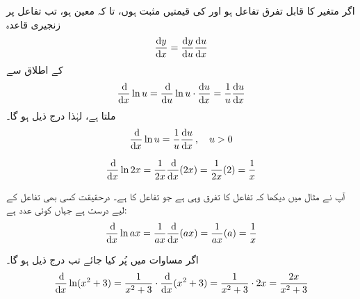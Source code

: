 اگر  متغیر  کا قابل تفرق تفاعل ہو اور  کی قیمتیں مثبت ہوں، تا کہ  معین  ہو، تب تفاعل  پر زنجیری قاعدہ
\begin{align*}
\frac{\dif y}{\dif x}=\frac{\dif y}{\dif u}\frac{\dif u}{\dif x}
\end{align*}
 کے اطلاق سے 
\begin{align*}
\frac{\dif}{\dif x}\ln u=\frac{\dif}{\dif u}\ln u\cdot \frac{\dif u}{\dif x}=\frac{1}{u}\frac{\dif u}{\dif x}
\end{align*}
ملتا ہے، لہٰذا درج ذیل ہو گا۔
\begin{align}\label{مساوات_ماورائی_لوگارتھمی_تفرق_الف}
\frac{\dif}{\dif x}\ln u=\frac{1}{u}\frac{\dif u}{\dif x} \, ,\quad u>0
\end{align}

\begin{align*}
\frac{\dif}{\dif x}\ln 2x=\frac{1}{2x}\frac{\dif}{\dif x}(2x)=\frac{1}{2x}(2)=\frac{1}{x}
\end{align*}

آپ نے مثال  میں دیکھا کہ تفاعل  کا تفرق وہی ہے جو تفاعل  کا ہے۔ درحقیقت کسی بھی تفاعل  کے لیے درست ہے جہاں  کوئی عدد ہے:
\begin{align}\label{مساوات_ماورائی_لوگارتھمی_تفرق_ب}
\frac{\dif}{\dif x}\ln ax=\frac{1}{ax}\frac{\dif}{\dif x}(ax)=\frac{1}{ax}(a)=\frac{1}{x}
\end{align}

اگر مساوات  میں  پُر کیا جائے تب درج ذیل ہو گا۔
\begin{align*}
\frac{\dif}{\dif x}\ln(x^2+3)=\frac{1}{x^2+3}\cdot\frac{\dif}{\dif x}(x^2+3)=\frac{1}{x^2+3}\cdot 2x=\frac{2x}{x^2+3}
\end{align*}

